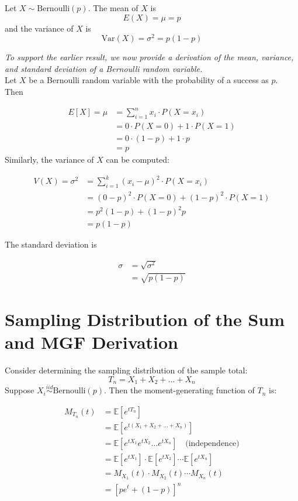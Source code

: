 \begin{definition}
Let \( X \sim \text{Bernoulli}(p) \). The mean of \( X \) is
\[
E(X) = \mu = p
\]
and the variance of \( X \) is
\[
\text{Var}(X) = \sigma^2 = p(1 - p)
\]
\end{definition} 
\textit{To support the earlier result, we now provide a derivation of the mean, variance, and standard deviation of a Bernoulli random variable.}
\vspace{1,0em}  \\
Let \( X \) be a Bernoulli random variable with the probability of a success as \( p \). Then

\begin{align*}
E[X] = \mu & = \sum_{i=1}^{n} x_i \cdot P(X = x_i) \\
&= 0 \cdot P(X = 0) + 1 \cdot P(X = 1) \\
&= 0 \cdot (1 - p) + 1 \cdot p \\
&= p
\end{align*}
Similarly, the variance of \( X \) can be computed:

\begin{align*}
V(X) = \sigma^2 & = \sum_{i=1}^{k} (x_i - \mu)^2 \cdot P(X = x_i) \\
&= (0 - p)^2 \cdot P(X = 0) + (1 - p)^2 \cdot P(X = 1) \\
&= p^2 (1 - p) + (1 - p)^2 p \\
&= p(1 - p)
\end{align*}

The standard deviation is

\begin{align*}
\sigma & = \sqrt{\sigma^2} \\
            & = \sqrt{p(1 - p)}
\end{align*}




\section{Sampling Distribution of the Sum and MGF Derivation}

Consider determining the sampling distribution of the sample total:
\[
T_n = X_1 + X_2 + \dots + X_n
\]
Suppose \( X_i \overset{iid}{\sim} \text{Bernoulli}(p) \). Then the moment-generating function of \( T_n \) is:

\begin{align*}
M_{T_n}(t) &= \mathbb{E}[e^{t T_n}] \\
           &= \mathbb{E}\left[e^{t(X_1 + X_2 + \dots + X_n)}\right] \\
           &= \mathbb{E}\left[e^{tX_1} e^{tX_2} \dots e^{tX_n} \right] \quad \text{(independence)} \\
           &= \mathbb{E}[e^{tX_1}] \cdot \mathbb{E}[e^{tX_2}] \cdots \mathbb{E}[e^{tX_n}] \\
           &= M_{X_1}(t) \cdot M_{X_2}(t) \cdots M_{X_n}(t) \\
           &= \left[pe^t + (1 - p)\right]^n
\end{align*}


